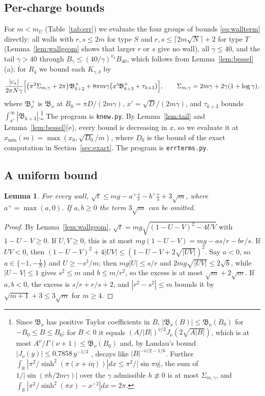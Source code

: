 \documentclass[11pt]{amsart}
\numberwithin{equation}{section}
\theoremstyle{plain}
\newtheorem{lem}[thm]{Lemma}
\theoremstyle{definition}
\theoremstyle{remark}
\newcommand{\R}{\mathbb{R}}
\begin{document}
\subsection{Per-charge bounds}
For $m<m_U$ (Table~\ref{tab:err}) we evaluate the four groups of bounds \eqref{eq:wallterm} directly: all walls with $r,s\le2m$ for type $S$ and $r,s\le\lceil2m\sqrt N\rceil+2$ for type $T$ (Lemma~\ref{lem:wallgeom} shows that larger $r$ or $s$ give no wall), all $\gamma\le40$, and the tail $\gamma>40$ through $B_\gamma\le(40/\gamma)^{\nu_k}B_{40}$, which follows from Lemma~\ref{lem:bessel}(a); for $R_4$ we bound each $K_{\gamma,\delta}$ by
\[
\frac{|c_*|}{2\pi N\gamma}\Bigl[\bigl(\pi^2\Sigma_{m,\gamma}+2\pi\bigr)\mathfrak B^+_{k+2}+8\pi m\gamma\bigl(x'\mathfrak B^+_{k+3}+\tau_{k+3}\bigr)\Bigr],\qquad \Sigma_{m,\gamma}=2m\gamma+2\gamma(1+\log\gamma),
\]
where $\mathfrak B^+_\nu$ is $\mathfrak B_\nu$ at $B_0=\pi D/(2m\gamma)$, $x'=\sqrt D/(2m\gamma)$, and $\tau_{k+3}$ bounds $\int_{x'}^\infty|\mathfrak B_{k+3}|$.\footnote{Since $\mathfrak B_\nu$ has positive Taylor coefficients in $B$, $|\mathfrak B_\nu(B)|\le\mathfrak B_\nu(B_0)$ for $-B_0\le B\le B_0$; for $B<0$ it equals $(A/|B|)^{\nu/2}J_\nu(2\sqrt{A|B|})$, which is at most $A^\nu/\Gamma(\nu+1)\le\mathfrak B_\nu(B_0)$ and, by Landau's bound $|J_\nu(y)|\le0.7858\,y^{-1/3}$ \cite{Lan00}, decays like $|B|^{-\nu/2-1/6}$. Further $\int_\R|\pi^2/\sinh^2(\pi(x+i\eta))|dx\le\pi^2/|\sin\pi\eta|$, the sum of $1/|\sin(\pi h/2m\gamma)|$ over the $\gamma$ admissible $h\not\equiv0$ is at most $\Sigma_{m,\gamma}$, and $\int_\R|\pi^2/\sinh^2(\pi x)-x^{-2}|dx=2\pi$.} The program is \texttt{knew.py}. By Lemma~\ref{lem:tail} and Lemma~\ref{lem:bessel}(e), every bound is decreasing in $x$, so we evaluate it at $x_{\min}(m)=\max(x_0,\sqrt{D_0}/m)$, where $D_0$ is the bound of the exact computation in Section~\ref{sec:exact}. The program is \texttt{errterms.py}.

\subsection{A uniform bound}
\begin{lem}\label{lem:sqrt-t}
For every wall, $\sqrt t\le mg-a^+\frac sr-b^+\frac rs+3\sqrt m$, where $a^+=\max(a,0)$. If $a,b\ge0$ the term $3\sqrt m$ can be omitted.
\end{lem}

\begin{proof}
By Lemma~\ref{lem:wallgeom}, $\sqrt t=mg\sqrt{(1-U-V)^2-4UV}$ with $1-U-V\ge0$. If $U,V\ge0$, this is at most $mg(1-U-V)=mg-as/r-br/s$. If $UV<0$, then $(1-U-V)^2+4|UV|\le(1-U-V+2\sqrt{|UV|})^2$. Say $a<0$, so $a\in\{-1,-\frac1N\}$ and $U\ge-s^2/m$; then $mg|U|\le s/r$ and $2mg\sqrt{|UV|}\le2\sqrt{b}$, while $|U-V|\le1$ gives $s^2\le m$ and $b\le m/r^2$, so the excess is at most $\sqrt m+2\sqrt m$. If $a,b<0$, the excess is $s/r+r/s+2$, and $|r^2-s^2|\le m$ bounds it by $\sqrt{m+1}+3\le3\sqrt m$ for $m\ge4$.
\end{proof}
\end{document}
